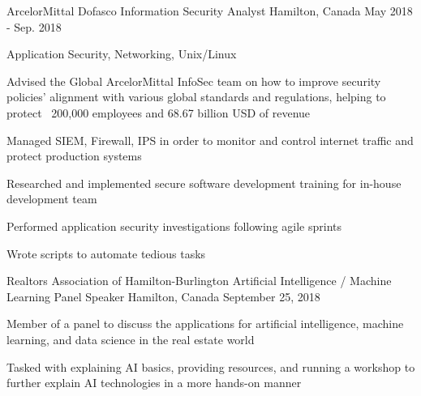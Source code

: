 

\begin{cventries}

\vspace{-2mm}
  \cventry
    {ArcelorMittal Dofasco} %
    {Information Security Analyst} %
    {Hamilton, Canada} %
    {May 2018 - Sep. 2018} %
    {
      \begin{cvitems} %
	\item{ Application Security, Networking, Unix/Linux }
        \item {Advised the Global ArcelorMittal InfoSec team on how to improve security policies' alignment 
with various global standards and regulations, helping to protect ~200,000 employees and 68.67 
billion USD of revenue}
    	\item {Managed SIEM, Firewall, IPS in order to monitor and control internet traffic and protect production systems}
    	\item {Researched and implemented secure software development training for in-house development team}
    	\item {Performed application security investigations following agile sprints}
	\item {Wrote scripts to automate tedious tasks}
      \end{cvitems}
    }
\cventry
    {Realtors Association of Hamilton-Burlington} %
    {Artificial Intelligence / Machine Learning Panel Speaker} %
    {Hamilton, Canada} %
    {September 25, 2018} %
    {
      \begin{cvitems} %
    	\item {Member of a panel to discuss the applications for artificial intelligence, machine learning, and data science in the real estate world}
        \item {Tasked with explaining AI basics, providing resources, and running a workshop to further explain AI technologies in a more hands-on manner}

\end{cvitems}}
\end{cventries}
